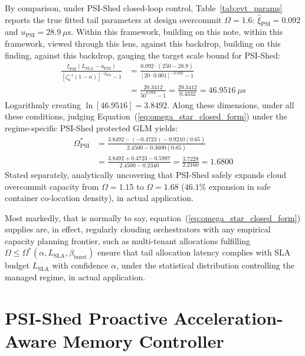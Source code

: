 \documentclass[pdflatex,sn-mathphys,Numbered]{sn-jnl}
\begin{document}
By comparison, under PSI-Shed closed-loop control, Table~\ref{tab:evt_params} reports the true fitted tail parameters at design overcommit $\Omega = 1.6$: $\hat{\xi}_{\text{PSI}} = 0.092$ and $u_{\text{PSI}} = 28.9\ \mu\text{s}$. Within this framework, building on this note, within this framework, viewed through this lens, against this backdrop, building on this finding, against this backdrop, gauging the target scale bound for PSI-Shed:
\begin{equation}
\begin{aligned}
\frac{\xi_{\text{PSI}} (L_{\text{SLA}} - u_{\text{PSI}})}{\left[\zeta_u^{-1}(1 - \alpha)\right]^{-\xi_{\text{PSI}}} - 1} &= \frac{0.092 \cdot (250 - 28.9)}{\left[20 \cdot 0.001\right]^{-0.092} - 1} \\
&= \frac{20.3412}{50^{0.092} - 1} = \frac{20.3412}{0.4332} = 46.9516\ \mu\text{s}
\end{aligned}
\label{eq:inner_eval_psi}
\end{equation}
Logarithmly creating $\ln[46.9516] = 3.8492$. Along these dimensions, under all these conditions, judging Equation~(\ref{eq:omega_star_closed_form}) under the regime-specific PSI-Shed protected GLM yields:
\begin{equation}
\begin{aligned}
\Omega_{\text{PSI}}^* &= \frac{3.8492 - (-0.4723) - 0.9210(0.65)}{2.4500 - 0.3600(0.65)} \\
&= \frac{3.8492 + 0.4723 - 0.5987}{2.4500 - 0.2340} = \frac{3.7228}{2.2160} = 1.6800
\end{aligned}
\label{eq:eval_psi}
\end{equation}
Stated separately, analytically uncovering that PSI-Shed safely expands cloud overcommit capacity from $\Omega = 1.15$ to $\Omega = 1.68$ ($46.1\%$ expansion in safe container co-location density), in actual application.

Most markedly, that is normally to say, equation~(\ref{eq:omega_star_closed_form}) supplies are, in effect, regularly clouding orchestrators with any empirical capacity planning frontier, such as multi-tenant allocations fulfilling $\Omega \le \Omega^*(\alpha, L_{\text{SLA}}, \beta_{\text{burst}})$ ensure that tail allocation latency complies with SLA budget $L_{\text{SLA}}$ with confidence $\alpha$, under the statistical distribution controlling the managed regime, in actual application.

\section{PSI-Shed Proactive Acceleration-Aware Memory Controller}
\label{sec:psished}
\end{document}
